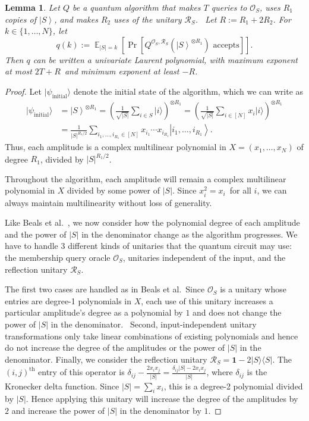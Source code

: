 \documentclass[10pt,a4paper]{article}
\newtheorem{lemma}[theorem]{Lemma}
\newcommand{\<}{\langle}
\renewcommand{\>}{\rangle}
\DeclareMathOperator{\E}{\mathbb E}
\newcommand{\id}{\mathbf 1}
\newcommand{\R}{\mathcal R}
\begin{document}
\begin{lemma}
\label{laurentlem} Let $Q$ be a quantum algorithm that makes $T$ queries to $
\mathcal{O}_{S}$, uses $R_1$ copies of $\left\vert S\right\rangle $, and
makes $R_2$ uses of the unitary $\mathcal{R}_S$. \ Let $R:= R_1 + 2R_2$. 
For $k\in\{1,\ldots,N\}$, let
\begin{equation}
q\left( k\right) :=\E_{\left\vert S\right\vert =k}\left[ \Pr\left[ Q^{
\mathcal{O}_{S},\mathcal{R}_S}\left( \left\vert S\right\rangle ^{\otimes
R_1}\right) \text{ accepts}\right] \right] .
\end{equation}
Then $q$ can be written a univariate Laurent polynomial, with maximum 
exponent at most $2T+R$\ and minimum exponent at least $-R$.
\end{lemma}

\begin{proof}
Let $|\psi_\mathrm{initial}\>$ denote the initial state of the algorithm,
which we can write as
\begin{align*}
|\psi_\mathrm{initial}\> &=
\left\vert S\right\rangle ^{\otimes R_1}
=\left(\frac{1}{\sqrt{|S|}} \sum_{i\in S}|i\>\right)^{\otimes R_1}
=\left(\frac{1}{\sqrt{|S|}} \sum_{i\in [N]}x_i|i\>\right)^{\otimes R_1}\\
&=\frac{1}{\left\vert S\right\vert ^{R_1/2}}\sum_{i_{1},\ldots,i_{R_1}\in\left[
N\right]  }x_{i_{1}}\cdots x_{i_{R_1}}\left\vert i_{1},\ldots,i_{R_1}\right\rangle.
\end{align*}
Thus, each amplitude is a complex multilinear polynomial in $X=\left(
x_{1},\ldots,x_{N}\right)  $ of degree $R_1$, divided by $\left\vert
S\right\vert ^{R_1/2}$.

Throughout the algorithm, each amplitude will remain a complex multilinear
polynomial in $X$ divided by some power of $|S|$.
Since $x_{i}^{2}=x_{i}$\ for all $i$, we can always
maintain multilinearity without loss of generality.

Like Beals et al.\ \cite{bbcmw}, we now consider how the polynomial degree of each amplitude and the power of $|S|$ in the denominator change as the algorithm progresses.
We have to handle 3 different kinds of unitaries that the quantum circuit may use:
the membership query oracle $\mathcal{O}_S$, unitaries independent of the input,
and the reflection unitary $\R_S$.

The first two cases are handled as in Beals et al.\
Since $\mathcal{O}_S$ is a unitary whose entries are degree-1 polynomials
in $X$, each use of this unitary increases a particular
amplitude's degree as a polynomial by $1$ and does not change the power of $|S|$ in the denominator. \
Second, input-independent unitary transformations only take linear
combinations of existing polynomials and hence do not increase the degree of the amplitudes or the power of $|S|$ in the denominator.
Finally, we consider the reflection unitary $\R_S = \id - 2|S\>\<S|$.
The $(i,j)^\mathrm{th}$ entry of this operator is $\delta_{ij} - \frac{2x_ix_j}{|S|} = \frac{\delta_{ij}|S| - 2x_ix_j}{|S|}$, where $\delta_{ij}$ is the Kronecker delta function.
Since $|S| = \sum_i x_i$, this is a degree-2 polynomial divided by $|S|$.
Hence applying this unitary will increase the degree of the amplitudes by $2$ and increase
the power of $|S|$ in the denominator by $1$.


\end{proof}
\end{document}

